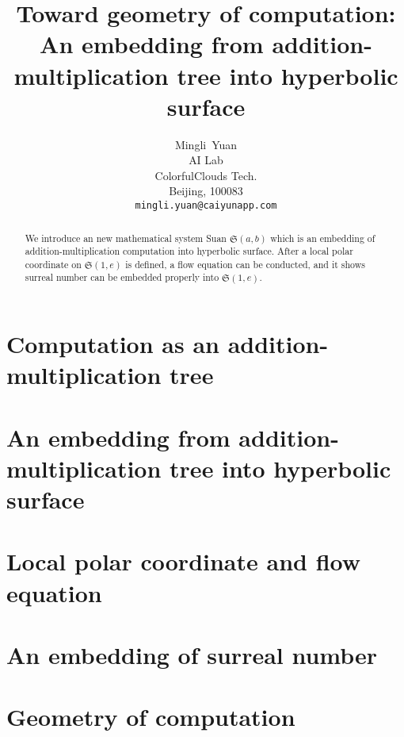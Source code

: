 \documentclass{article}
\title{Toward geometry of computation: An embedding from addition-multiplication tree into hyperbolic surface}
\author{
  Mingli~Yuan \\
  AI Lab \\
  ColorfulClouds Tech.\\
  Beijing, 100083 \\
  \texttt{mingli.yuan@caiyunapp.com} \\
}
\begin{document}
\maketitle

\begin{abstract}
    We introduce an new mathematical system Suan $\mathfrak{S}(a, b)$ which is an embedding of addition-multiplication
    computation into hyperbolic surface. After a local polar coordinate on $\mathfrak{S}(1, e)$ is defined, a flow
    equation can be conducted, and it shows surreal number can be embedded properly into $\mathfrak{S}(1, e)$.
\end{abstract}


\section{Computation as an addition-multiplication tree}\label{sec:caaamt}

\section{An embedding from addition-multiplication tree into hyperbolic surface}\label{sec:aefamtihs}

\section{Local polar coordinate and flow equation}\label{sec:lpcsafe}

\section{An embedding of surreal number}\label{sec:aeosn}

\section{Geometry of computation}\label{sec:gioc}




\end{document}
